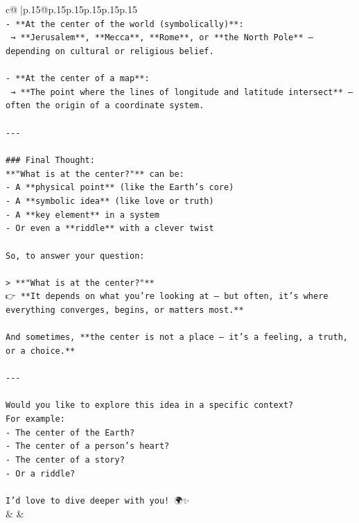 \documentclass{article}
\begin{document}
{\begin{supertabular}{c@{$\;$}|p{.15\linewidth}@{}p{.15\linewidth}p{.15\linewidth}p{.15\linewidth}p{.15\linewidth}p{.15\linewidth}}
{{{\\ 
\texttt{{-} **At the center of the world (symbolically)**:  } \\
\texttt{  → **Jerusalem**, **Mecca**, **Rome**, or **the North Pole** — depending on cultural or religious belief.} \\
\\ 
\texttt{{-} **At the center of a map**:  } \\
\texttt{  → **The point where the lines of longitude and latitude intersect** — often the origin of a coordinate system.} \\
\\ 
\texttt{{-}{-}{-}} \\
\\ 
\texttt{\#\#\# Final Thought:} \\
\texttt{**"What is at the center?"** can be:} \\
\texttt{{-} A **physical point** (like the Earth’s core)} \\
\texttt{{-} A **symbolic idea** (like love or truth)} \\
\texttt{{-} A **key element** in a system} \\
\texttt{{-} Or even a **riddle** with a clever twist} \\
\\ 
\texttt{So, to answer your question:} \\
\\ 
\texttt{> **"What is at the center?"**  } \\
\texttt{👉 **It depends on what you're looking at — but often, it’s where everything converges, begins, or matters most.**} \\
\\ 
\texttt{And sometimes, **the center is not a place — it’s a feeling, a truth, or a choice.**} \\
\\ 
\texttt{{-}{-}{-}} \\
\\ 
\texttt{Would you like to explore this idea in a specific context?  } \\
\texttt{For example:} \\
\texttt{{-} The center of the Earth?} \\
\texttt{{-} The center of a person’s heart?} \\
\texttt{{-} The center of a story?} \\
\texttt{{-} Or a riddle?} \\
\\ 
\texttt{I’d love to dive deeper with you! 🌍✨} \\
            }
        }
    }
    & & \\ \\


\end{supertabular}}
\end{document}

